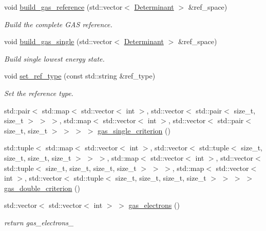 \begin{DoxyCompactItemize}
void \mbox{\hyperlink{classforte_1_1_c_i___reference_a9dacb4b7abc2e1058065263fa32d072d}{build\+\_\+gas\+\_\+reference}} (std\+::vector$<$ \mbox{\hyperlink{namespaceforte_a2076c63fd7b8732004d9e1442ce527c1}{Determinant}} $>$ \&ref\+\_\+space)
\begin{DoxyCompactList}\small\item\em Build the complete G\+AS reference. \end{DoxyCompactList}\item 
void \mbox{\hyperlink{classforte_1_1_c_i___reference_abd3e854b9dcfe0f8105a2a5fbe42b6dd}{build\+\_\+gas\+\_\+single}} (std\+::vector$<$ \mbox{\hyperlink{namespaceforte_a2076c63fd7b8732004d9e1442ce527c1}{Determinant}} $>$ \&ref\+\_\+space)
\begin{DoxyCompactList}\small\item\em Build single lowest energy state. \end{DoxyCompactList}\item 
void \mbox{\hyperlink{classforte_1_1_c_i___reference_a7d3441e0ac01abaf7f9971dbc4a8f2d8}{set\+\_\+ref\+\_\+type}} (const std\+::string \&ref\+\_\+type)
\begin{DoxyCompactList}\small\item\em Set the reference type. \end{DoxyCompactList}\item 
std\+::pair$<$ std\+::map$<$ std\+::vector$<$ int $>$, std\+::vector$<$ std\+::pair$<$ size\+\_\+t, size\+\_\+t $>$ $>$ $>$, std\+::map$<$ std\+::vector$<$ int $>$, std\+::vector$<$ std\+::pair$<$ size\+\_\+t, size\+\_\+t $>$ $>$ $>$ $>$ \mbox{\hyperlink{classforte_1_1_c_i___reference_af3414d78ff86d2a43d174b9f3a86b84f}{gas\+\_\+single\+\_\+criterion}} ()
\item 
std\+::tuple$<$ std\+::map$<$ std\+::vector$<$ int $>$, std\+::vector$<$ std\+::tuple$<$ size\+\_\+t, size\+\_\+t, size\+\_\+t, size\+\_\+t $>$ $>$ $>$, std\+::map$<$ std\+::vector$<$ int $>$, std\+::vector$<$ std\+::tuple$<$ size\+\_\+t, size\+\_\+t, size\+\_\+t, size\+\_\+t $>$ $>$ $>$, std\+::map$<$ std\+::vector$<$ int $>$, std\+::vector$<$ std\+::tuple$<$ size\+\_\+t, size\+\_\+t, size\+\_\+t, size\+\_\+t $>$ $>$ $>$ $>$ \mbox{\hyperlink{classforte_1_1_c_i___reference_a3508cacd0adb39a9b4288f9358b0f5fe}{gas\+\_\+double\+\_\+criterion}} ()
\item 
std\+::vector$<$ std\+::vector$<$ int $>$ $>$ \mbox{\hyperlink{classforte_1_1_c_i___reference_a590b197025d117d464b6639379ccc831}{gas\+\_\+electrons}} ()
\begin{DoxyCompactList}\small\item\em return gas\+\_\+electrons\+\_\+ \end{DoxyCompactList}\end{DoxyCompactItemize}
